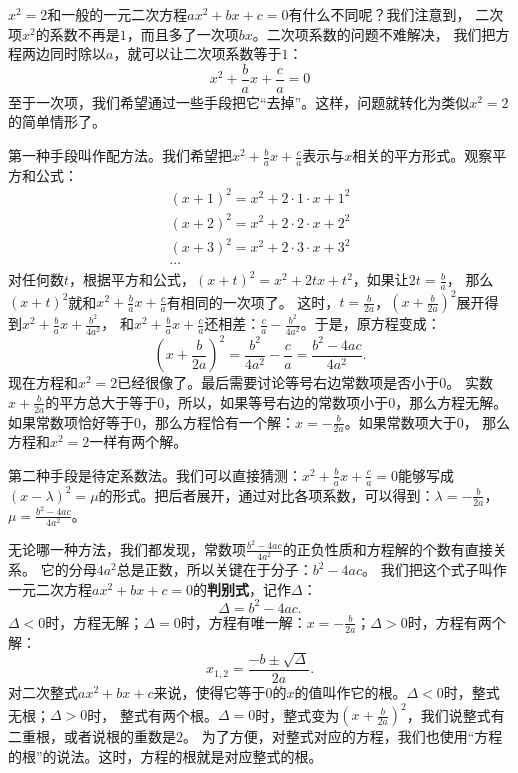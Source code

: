 \documentclass[12pt,UTF8,fontset=none]{ctexbook}
\begin{document}
$x^2 = 2$和一般的一元二次方程$ax^2 + bx + c = 0$有什么不同呢？我们注意到，
二次项$x^2$的系数不再是$1$，而且多了一次项$bx$。二次项系数的问题不难解决，
我们把方程两边同时除以$a$，就可以让二次项系数等于$1$：
$$ x^2 + \frac{b}{a} x + \frac{c}{a} = 0$$
至于一次项，我们希望通过一些手段把它“去掉”。这样，问题就转化为类似$x^2 = 2$的简单情形了。

第一种手段叫作配方法。我们希望把$x^2 + \frac{b}{a}x + \frac{c}{a}$表示与$x$相关的平方形式。观察平方和公式：
\begin{align*}
    (x + 1)^2 = x^2 + 2\cdot 1\cdot x + 1^2  \\
    (x + 2)^2 = x^2 + 2\cdot 2\cdot x + 2^2  \\
    (x + 3)^2 = x^2 + 2\cdot 3\cdot x + 3^2  \\
    \cdots 
\end{align*}
对任何数$t$，根据平方和公式，$(x + t)^2 = x^2 + 2tx + t^2$，如果让$2t = \frac{b}{a}$，
那么$(x + t)^2$就和$x^2 + \frac{b}{a}x + \frac{c}{a}$有相同的一次项了。
这时，$t = \frac{b}{2a}$，$(x + \frac{b}{2a})^2$展开得到$x^2 + \frac{b}{a}x + \frac{b^2}{4a^2} $，
和$x^2 + \frac{b}{a}x + \frac{c}{a}$还相差：$\frac{c}{a} - \frac{b^2}{4a^2}$。于是，原方程变成：
$$ \left(x + \frac{b}{2a}\right)^2 = \frac{b^2}{4a^2} - \frac{c}{a} = \frac{b^2 - 4ac}{4a^2}.$$
现在方程和$x^2 = 2$已经很像了。最后需要讨论等号右边常数项是否小于$0$。
实数$x + \frac{b}{2a}$的平方总大于等于$0$，所以，如果等号右边的常数项小于$0$，那么方程无解。
如果常数项恰好等于$0$，那么方程恰有一个解：$x = -\frac{b}{2a}$。如果常数项大于$0$，
那么方程和$x^2 = 2$一样有两个解。

第二种手段是待定系数法。我们可以直接猜测：$x^2 + \frac{b}{a} x + \frac{c}{a} = 0$能够写成
$(x - \lambda)^2 = \mu$的形式。把后者展开，通过对比各项系数，可以得到：$\lambda = -\frac{b}{2a}$，
$\mu = \frac{b^2 - 4ac}{4a^2}$。

无论哪一种方法，我们都发现，常数项$\frac{b^2 - 4ac}{4a^2}$的正负性质和方程解的个数有直接关系。
它的分母$4a^2$总是正数，所以关键在于分子：$b^2 - 4ac$。
我们把这个式子叫作一元二次方程$ax^2 + bx + c = 0$的\textbf{判别式}，记作$\Delta$：
$$\Delta = b^2 - 4ac.$$
$\Delta<0$时，方程无解；$\Delta = 0$时，方程有唯一解：$x = -\frac{b}{2a}$；$\Delta>0$时，方程有两个解：
$$x_{1,2} = \frac{-b \pm \sqrt{\Delta}}{2a}.$$
对二次整式$ax^2 + bx + c$来说，使得它等于$0$的$x$的值叫作它的根。$\Delta<0$时，整式无根；$\Delta>0$时，
整式有两个根。$\Delta = 0$时，整式变为$(x + \frac{b}{2a})^2$，我们说整式有二重根，或者说根的重数是$2$。
为了方便，对整式对应的方程，我们也使用“方程的根”的说法。这时，方程的根就是对应整式的根。
\end{document}
